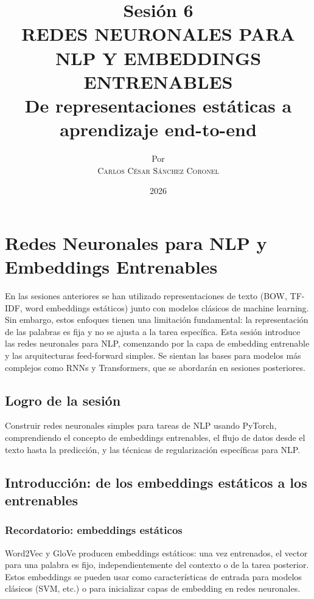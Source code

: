 \documentclass[12pt,a4paper,openany,oneside]{book}
\title{
    \textbf{Sesión 6} \\ 
    \Huge \textbf{REDES NEURONALES PARA NLP Y EMBEDDINGS ENTRENABLES} \\
    \Large De representaciones estáticas a aprendizaje end-to-end
}
\author{
    \small Por \\ \vspace{0.2cm}
    \Large \textsc{Carlos César Sánchez Coronel}
}
\date{2026}
\begin{document}
\maketitle
\tableofcontents
{}

\chapter{Redes Neuronales para NLP y Embeddings Entrenables}

En las sesiones anteriores se han utilizado representaciones de texto (BOW, TF-IDF, word embeddings estáticos) junto con modelos clásicos de machine learning. Sin embargo, estos enfoques tienen una limitación fundamental: la representación de las palabras es fija y no se ajusta a la tarea específica. Esta sesión introduce las redes neuronales para NLP, comenzando por la capa de embedding entrenable y las arquitecturas feed-forward simples. Se sientan las bases para modelos más complejos como RNNs y Transformers, que se abordarán en sesiones posteriores.

\section{Logro de la sesión}
Construir redes neuronales simples para tareas de NLP usando PyTorch, comprendiendo el concepto de embeddings entrenables, el flujo de datos desde el texto hasta la predicción, y las técnicas de regularización específicas para NLP.

\section{Introducción: de los embeddings estáticos a los entrenables}

\subsection{Recordatorio: embeddings estáticos}
Word2Vec y GloVe producen embeddings estáticos: una vez entrenados, el vector para una palabra es fijo, independientemente del contexto o de la tarea posterior. Estos embeddings se pueden usar como características de entrada para modelos clásicos (SVM, etc.) o para inicializar capas de embedding en redes neuronales.
\end{document}
